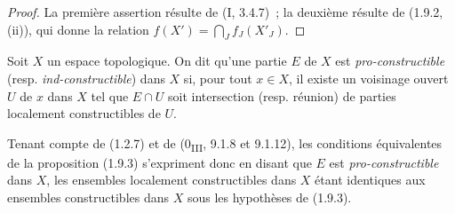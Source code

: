 \begin{proof}
La première assertion résulte de (I, 3.4.7)~; la deuxième résulte de (1.9.2,
(ii)), qui donne la relation $f(X')=\bigcap_Jf_J(X'_J)$.
\end{proof}

\begin{definition}[1.9.4]
\label{IV.1.9.4-fr}
Soit $X$ un espace topologique. On dit qu'une partie $E$ de $X$ est
\emph{pro-constructible} (resp. \emph{ind-constructible}) dans $X$ si, pour
tout $x\in X$, il existe un voisinage ouvert $U$ de $x$ dans $X$ tel que
$E\cap U$ soit intersection (resp. réunion) de parties localement
constructibles de $U$.
\end{definition}

Tenant compte de (1.2.7) et de (0\textsubscript{III}, 9.1.8 et 9.1.12), les
conditions équivalentes de la proposition (1.9.3) s'expriment donc en disant
que $E$ est \emph{pro-constructible} dans $X$, les ensembles localement
constructibles dans $X$ étant identiques aux ensembles constructibles dans
$X$ sous les hypothèses de (1.9.3).


